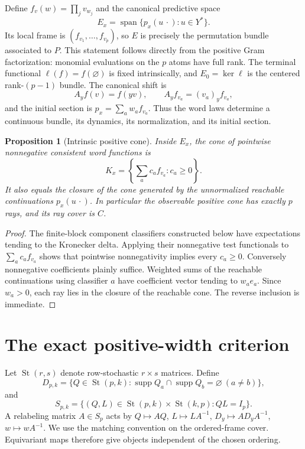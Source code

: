 \documentclass[11pt]{article}
\newtheorem{proposition}[theorem]{Proposition}
\theoremstyle{remark}\newtheorem{remark}[theorem]{Remark}
\newcommand{\supp}{\operatorname{supp}}
\newcommand{\St}{\operatorname{St}}
\begin{document}
Define $f_v(w)=\prod_jv_{w_j}$ and the canonical predictive space
\[
 E_x=\operatorname{span}\{p_x(u\,\cdot):u\in Y^*\}.
\]
Its local frame is $(f_{v_1},\ldots,f_{v_p})$, so $E$ is precisely the permutation bundle associated to $P$. This statement follows directly from the positive Gram factorization: monomial evaluations on the $p$ atoms have full rank. The terminal functional $\ell(f)=f(\varnothing)$ is fixed intrinsically, and $E_0=\ker\ell$ is the centered rank-$(p-1)$ bundle. The canonical shift is
\[
 A_yf(v)=f(yv),\qquad A_yf_{v_a}=(v_a)_y f_{v_a},
\]
and the initial section is $p_x=\sum_aw_af_{v_a}$. Thus the word laws determine a continuous bundle, its dynamics, its normalization, and its initial section.

\begin{proposition}[Intrinsic positive cone]\label{prop:cone}
Inside $E_x$, the cone of pointwise nonnegative consistent word functions is
\[
 K_x=\left\{\sum_ac_af_{v_a}:c_a\geq0\right\}.
\]
It also equals the closure of the cone generated by the unnormalized reachable continuations $p_x(u\,\cdot)$. In particular the observable positive cone has exactly $p$ rays, and its ray cover is $C$.
\end{proposition}
\begin{proof}
The finite-block component classifiers constructed below have expectations tending to the Kronecker delta. Applying their nonnegative test functionals to $\sum_ac_af_{v_a}$ shows that pointwise nonnegativity implies every $c_a\geq0$. Conversely nonnegative coefficients plainly suffice. Weighted sums of the reachable continuations using classifier $a$ have coefficient vector tending to $w_ae_a$. Since $w_a>0$, each ray lies in the closure of the reachable cone. The reverse inclusion is immediate.
\end{proof}

\section{The exact positive-width criterion}
Let $\St(r,s)$ denote row-stochastic $r\times s$ matrices. Define
\[
 D_{p,k}=\{Q\in\St(p,k):\supp Q_a\cap\supp Q_b=\varnothing\ (a\ne b)\},
\]
and
\[
 S_{p,k}=\{(Q,L)\in\St(p,k)\times\St(k,p):QL=I_p\}.
\]
A relabeling matrix $A\in S_p$ acts by $Q\mapsto AQ$, $L\mapsto LA^{-1}$, $D_y\mapsto AD_yA^{-1}$, $w\mapsto wA^{-1}$. We use the matching convention on the ordered-frame cover. Equivariant maps therefore give objects independent of the chosen ordering.
\end{document}
